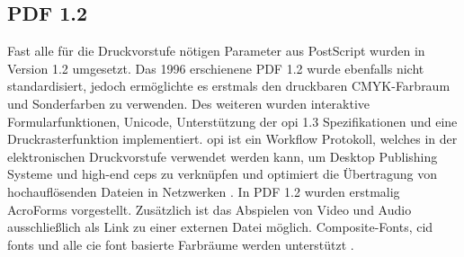 \subsection{PDF 1.2}
Fast alle für die Druckvorstufe nötigen Parameter aus PostScript wurden in Version 1.2 umgesetzt. Das 1996 erschienene PDF 1.2 wurde ebenfalls nicht standardisiert, jedoch ermöglichte es erstmals den druckbaren CMYK-Farbraum und Sonderfarben zu verwenden. Des weiteren wurden interaktive Formularfunktionen, Unicode, Unterstützung der \gls{opi} 1.3 Spezifikationen und eine Druckrasterfunktion implementiert\cite{proj-consult}. \gls{opi} ist ein Workflow Protokoll, welches in der elektronischen Druckvorstufe verwendet werden kann, um Desktop Publishing Systeme und high-end \gls{ceps} zu verknüpfen und optimiert die Übertragung von hochauflösenden Dateien in Netzwerken \cite{printwiki}. In PDF 1.2 wurden erstmalig AcroForms vorgestellt. Zusätzlich ist das Abspielen von Video und Audio ausschließlich als Link zu einer externen Datei möglich. Composite-Fonts, \gls{cid} fonts und alle \gls{cie} font basierte Farbräume werden unterstützt \cite{schneeberger}.


